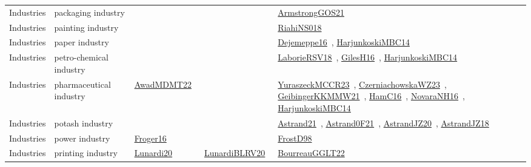 {\begin{longtable}{lp{3cm}>{\raggedright\arraybackslash}p{6cm}>{\raggedright\arraybackslash}p{6cm}>{\raggedright\arraybackslash}p{8cm}}
\index{packaging industry}\index{Industries!packaging industry}Industries & packaging industry &  &  & \href{../works/ArmstrongGOS21.pdf}{ArmstrongGOS21}~\cite{ArmstrongGOS21}\\
\index{painting industry}\index{Industries!painting industry}Industries & painting industry &  &  & \href{../works/RiahiNS018.pdf}{RiahiNS018}~\cite{RiahiNS018}\\
\index{paper industry}\index{Industries!paper industry}Industries & paper industry &  &  & \href{../works/Dejemeppe16.pdf}{Dejemeppe16}~\cite{Dejemeppe16}, \href{../works/HarjunkoskiMBC14.pdf}{HarjunkoskiMBC14}~\cite{HarjunkoskiMBC14}\\
\index{petro-chemical industry}\index{Industries!petro-chemical industry}Industries & petro-chemical industry &  &  & \href{../works/LaborieRSV18.pdf}{LaborieRSV18}~\cite{LaborieRSV18}, \href{../works/GilesH16.pdf}{GilesH16}~\cite{GilesH16}, \href{../works/HarjunkoskiMBC14.pdf}{HarjunkoskiMBC14}~\cite{HarjunkoskiMBC14}\\
\index{pharmaceutical industry}\index{Industries!pharmaceutical industry}Industries & pharmaceutical industry & \href{../works/AwadMDMT22.pdf}{AwadMDMT22}~\cite{AwadMDMT22} &  & \href{../works/YuraszeckMCCR23.pdf}{YuraszeckMCCR23}~\cite{YuraszeckMCCR23}, \href{../works/CzerniachowskaWZ23.pdf}{CzerniachowskaWZ23}~\cite{CzerniachowskaWZ23}, \href{../works/GeibingerKKMMW21.pdf}{GeibingerKKMMW21}~\cite{GeibingerKKMMW21}, \href{../works/HamC16.pdf}{HamC16}~\cite{HamC16}, \href{../works/NovaraNH16.pdf}{NovaraNH16}~\cite{NovaraNH16}, \href{../works/HarjunkoskiMBC14.pdf}{HarjunkoskiMBC14}~\cite{HarjunkoskiMBC14}\\
\index{potash industry}\index{Industries!potash industry}Industries & potash industry &  &  & \href{../works/Astrand21.pdf}{Astrand21}~\cite{Astrand21}, \href{../works/Astrand0F21.pdf}{Astrand0F21}~\cite{Astrand0F21}, \href{../works/AstrandJZ20.pdf}{AstrandJZ20}~\cite{AstrandJZ20}, \href{../works/AstrandJZ18.pdf}{AstrandJZ18}~\cite{AstrandJZ18}\\
\index{power industry}\index{Industries!power industry}Industries & power industry & \href{../works/Froger16.pdf}{Froger16}~\cite{Froger16} &  & \href{../works/FrostD98.pdf}{FrostD98}~\cite{FrostD98}\\
\index{printing industry}\index{Industries!printing industry}Industries & printing industry & \href{../works/Lunardi20.pdf}{Lunardi20}~\cite{Lunardi20} & \href{../works/LunardiBLRV20.pdf}{LunardiBLRV20}~\cite{LunardiBLRV20} & \href{../works/BourreauGGLT22.pdf}{BourreauGGLT22}~\cite{BourreauGGLT22}\\

\end{longtable}}
